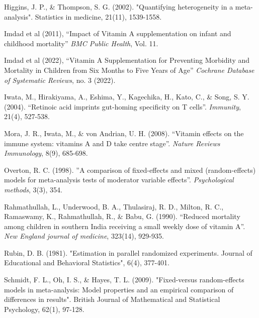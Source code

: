 \documentclass[12pt]{article}
\begin{document}
\begin{thebibliography}{99}
 Higgins, J. P., \& Thompson, S. G. (2002). "Quantifying heterogeneity in a meta-analysis". Statistics in medicine, 21(11), 1539-1558.

 Imdad et al (2011), ``Impact of Vitamin A supplementation on infant and childhood mortality'' \emph{BMC Public Health}, Vol. 11.

 Imdad et al (2022), ``Vitamin A Supplementation for Preventing Morbidity and Mortality in Children from Six Months to Five Years of Age'' \emph{Cochrane Database of Systematic Reviews}, no. 3 (2022).

 Iwata, M., Hirakiyama, A., Eshima, Y., Kagechika, H., Kato, C., \& Song, S. Y. (2004). ``Retinoic acid imprints gut-homing specificity on T cells''. \emph{Immunity}, 21(4), 527-538.


 Mora, J. R., Iwata, M., \& von Andrian, U. H. (2008). ``Vitamin effects on the immune system: vitamins A and D take centre stage''. \emph{Nature Reviews Immunology}, 8(9), 685-698.

 Overton, R. C. (1998). ''A comparison of fixed-effects and mixed (random-effects) models for meta-analysis tests of moderator variable effects''. \emph{Psychological methods}, 3(3), 354.

 Rahmathullah, L., Underwood, B. A., Thulasiraj, R. D., Milton, R. C., Ramaswamy, K., Rahmathullah, R., \& Babu, G. (1990). ``Reduced mortality among children in southern India receiving a small weekly dose of vitamin A''. \emph{New England journal of medicine}, 323(14), 929-935.

 Rubin, D. B. (1981). "Estimation in parallel randomized experiments. Journal of Educational and Behavioral Statistics", 6(4), 377-401.

 Schmidt, F. L., Oh, I. S., \& Hayes, T. L. (2009). "Fixed-versus random-effects models in meta-analysis: Model properties and an empirical comparison of differences in results". British Journal of Mathematical and Statistical Psychology, 62(1), 97-128.



\end{thebibliography}
\end{document}
